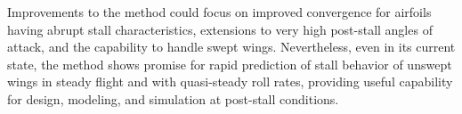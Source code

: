 Improvements to the method could focus on improved convergence for airfoils having abrupt stall characteristics, extensions to very high post-stall angles of attack, and the capability to handle swept wings. Nevertheless, even in its current state, the method shows promise for rapid prediction of stall behavior of unswept wings in steady flight and with quasi-steady roll rates, providing useful capability for design, modeling, and simulation at post-stall conditions.







